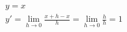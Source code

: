 \begin{ex}
\begin{align}
&y=x\nonumber\\
&y'=\lim_{h\rightarrow 0} \frac{x+h-x}{h}=\lim_{h\rightarrow 0} \frac{h}{h} =1\nonumber
\end{align}
\end{ex}
